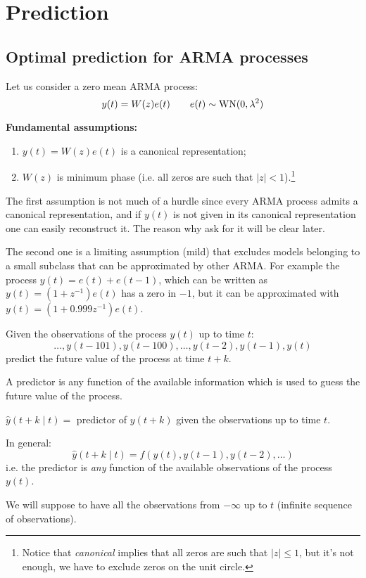 \chapter{Prediction}
\section{Optimal prediction for ARMA processes}
Let us consider a zero mean ARMA process:
\[
	y(t)=W(z)e(t) \qquad e(t)\sim \operatorname{WN}(0,\lambda^{2} )
\]

\textbf{Fundamental assumptions:}\label{assumptions-prediction-theory}
\begin{enumerate}
	\item $y(t) = W(z)e(t)$ is a canonical representation;
	\item $W(z)$ is minimum phase (i.e. all zeros are such that $|z|<1$).\footnote{Notice that \emph{canonical} implies that all zeros are such that $|z|\leq 1$, but it's not enough, we have to exclude zeros on the unit circle.}
\end{enumerate}
 
\begin{rem}
The first assumption is not much of a hurdle since every ARMA process admits a canonical representation, and if $y(t)$ is not given in its canonical representation one can easily reconstruct it. The reason why ask for it will be clear later. 

The second one is a limiting assumption (mild) that excludes models belonging to a small subclass that can be approximated by other ARMA. For example the process $y(t)=e(t)+e(t-1)$, which can be written as $y(t)=(1+z^{-1})e(t)$ has a zero in $-1$, but it can be approximated with $y(t)=(1+0.999z^{-1})e(t)$.
\end{rem}

Given the observations of the process $y(t)$ up to time $t$:
$$
	\ldots , y(t-101), y(t-100), \ldots , y(t-2), y(t-1), y(t)
$$
predict the future value of the process at time $t + k$.


A predictor is any function of the available information which is used to guess the future value of the process.

$\hat{y}(t + k \mid t) =$ predictor of $y(t + k)$ given the observations up to time $t$.

In general: 
$$\hat{y}(t + k \mid t) = f ( y(t), y(t-1), y(t-2),\ldots)$$
i.e. the predictor is \emph{any} function of the available observations of the process $y(t)$.

We will suppose to have all the observations from $-\infty$ up to $t$ (infinite sequence of observations).

